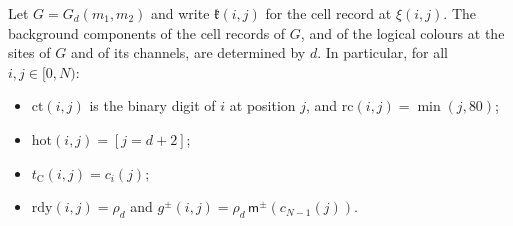 \begin{lemma}\label{bg:grid}
Let $G=G_d(m_1,m_2)$ and write $\mathfrak k(i,j)$ for the cell record at $\xi(i,j)$. The background components of the cell records of $G$, and of the logical colours at the sites of $G$ and of its channels, are determined by $d$. In particular, for all $i,j\in[0,N)$:
\begin{itemize}
\item[(a)] $\mathrm{ct}(i,j)$ is the binary digit of $i$ at position $j$, and $\mathrm{rc}(i,j)=\min(j,80)$;
\item[(b)] $\mathrm{hot}(i,j)=[j=d+2]$;
\item[(c)] $t_{\mathrm C}(i,j)=c_i(j)$;
\item[(d)] $\mathrm{rdy}(i,j)=\rho_d$ and $g^\pm(i,j)=\rho_d\,\mathsf m^\pm(c_{N-1}(j))$.
\end{itemize}
\end{lemma}

